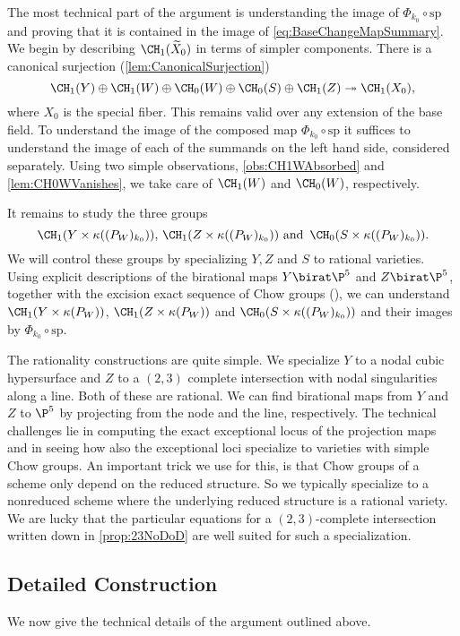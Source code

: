 The most technical part of the argument is understanding the image of $\Phi_{k_0} \circ \textrm{sp}$ and proving that it is contained in the image of \eqref{eq:BaseChangeMapSummary}. We begin by describing $\CH_1(\widetilde{X}_0)$ in terms of simpler components. There is a canonical surjection (\cref{lem:CanonicalSurjection})
\[\CH_1(Y) \oplus \CH_1(W) \oplus \CH_0(W) \oplus  \CH_0(S) \oplus \CH_1(Z) \twoheadrightarrow \CH_1(X_0),\]
where $X_0$ is the special fiber. This remains valid over any extension of the base field. To understand the image of the composed map $\Phi_{k_0} \circ \textrm{sp}$ it suffices to understand the image of each of the summands on the left hand side, considered separately. Using two simple observations, \cref{obs:CH1WAbsorbed} and \cref{lem:CH0WVanishes}, we take care of $\CH_1(W)$ and $\CH_0(W)$, respectively.

It remains to study the three groups 
\[\CH_1(Y \times \kappa((P_{W})_{k_0})), \, \CH_1(Z \times \kappa((P_{W})_{k_0})) \text{ and } \, \CH_0(S \times \kappa((P_{W})_{k_0})).\]
 We will control these groups by specializing $Y,Z$ and $S$ to rational varieties. Using explicit descriptions of the birational maps $Y \birat \P^5$ and $Z \birat \P^5$, together with the excision exact sequence of Chow groups (\cite[Proposition 1.8]{FultonIntersectionTheory}), we can understand $\CH_1(Y \times \kappa(P_W))$, $\CH_1(Z\times \kappa(P_W))$ and $\CH_0(S \times \kappa((P_{W})_{k_0}))$ and their images by $\Phi_{k_0} \circ \textrm{sp}$.
 
The rationality constructions are quite simple. We specialize $Y$ to a nodal cubic hypersurface and $Z$ to a $(2,3)$ complete intersection with nodal singularities along a line. Both of these are rational. We can find birational maps from $Y$ and $Z$ to $\P^5$ by projecting from the node and the line, respectively. The technical challenges lie in computing the exact exceptional locus of the projection maps and in seeing how also the exceptional loci specialize to varieties with simple Chow groups. An important trick we use for this, is that Chow groups of a scheme only depend on the reduced structure. So we typically specialize to a nonreduced scheme where the underlying reduced structure is a rational variety. We are lucky that the particular equations for a $(2,3)$-complete intersection written down in \cref{prop:23NoDoD} are well suited for such a specialization.

\subsection{Detailed Construction}
We now give the technical details of the argument outlined above. 

